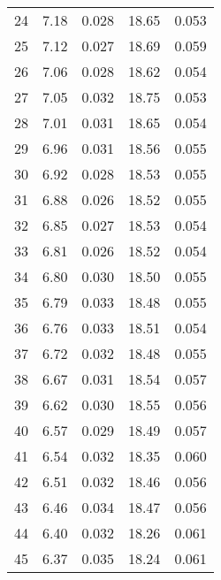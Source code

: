 \begin{table}
\begin{tabular}{c|ll|ll}
24 & 7.18 & 0.028 & 18.65 & 0.053 \\
25 & 7.12 & 0.027 & 18.69 & 0.059 \\
26 & 7.06 & 0.028 & 18.62 & 0.054 \\
27 & 7.05 & 0.032 & 18.75 & 0.053 \\
28 & 7.01 & 0.031 & 18.65 & 0.054 \\
29 & 6.96 & 0.031 & 18.56 & 0.055 \\
30 & 6.92 & 0.028 & 18.53 & 0.055 \\
31 & 6.88 & 0.026 & 18.52 & 0.055 \\
32 & 6.85 & 0.027 & 18.53 & 0.054 \\
33 & 6.81 & 0.026 & 18.52 & 0.054 \\
34 & 6.80 & 0.030 & 18.50 & 0.055 \\
35 & 6.79 & 0.033 & 18.48 & 0.055 \\
36 & 6.76 & 0.033 & 18.51 & 0.054 \\
37 & 6.72 & 0.032 & 18.48 & 0.055 \\
38 & 6.67 & 0.031 & 18.54 & 0.057 \\
39 & 6.62 & 0.030 & 18.55 & 0.056 \\
40 & 6.57 & 0.029 & 18.49 & 0.057 \\
41 & 6.54 & 0.032 & 18.35 & 0.060 \\
42 & 6.51 & 0.032 & 18.46 & 0.056 \\
43 & 6.46 & 0.034 & 18.47 & 0.056 \\
44 & 6.40 & 0.032 & 18.26 & 0.061 \\
45 & 6.37 & 0.035 & 18.24 & 0.061 \\
               \hline
        \end{tabular}
    \end{table}
    \clearpage

